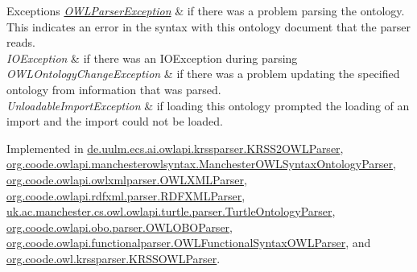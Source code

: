 \begin{DoxyExceptions}{Exceptions}
{\em \hyperlink{classorg_1_1semanticweb_1_1owlapi_1_1io_1_1_o_w_l_parser_exception}{O\-W\-L\-Parser\-Exception}} & if there was a problem parsing the ontology. This indicates an error in the syntax with this ontology document that the parser reads. \\
\hline
{\em I\-O\-Exception} & if there was an I\-O\-Exception during parsing \\
\hline
{\em O\-W\-L\-Ontology\-Change\-Exception} & if there was a problem updating the specified ontology from information that was parsed. \\
\hline
{\em Unloadable\-Import\-Exception} & if loading this ontology prompted the loading of an import and the import could not be loaded. \\
\hline
\end{DoxyExceptions}


Implemented in \hyperlink{classde_1_1uulm_1_1ecs_1_1ai_1_1owlapi_1_1krssparser_1_1_k_r_s_s2_o_w_l_parser_afd2431fc79f0a84255f0e6da71e5c0df}{de.\-uulm.\-ecs.\-ai.\-owlapi.\-krssparser.\-K\-R\-S\-S2\-O\-W\-L\-Parser}, \hyperlink{classorg_1_1coode_1_1owlapi_1_1manchesterowlsyntax_1_1_manchester_o_w_l_syntax_ontology_parser_ab5a6096e212c056cae3da829bb78554c}{org.\-coode.\-owlapi.\-manchesterowlsyntax.\-Manchester\-O\-W\-L\-Syntax\-Ontology\-Parser}, \hyperlink{classorg_1_1coode_1_1owlapi_1_1owlxmlparser_1_1_o_w_l_x_m_l_parser_aa7ce6fbe544a69e410945038dfb207fa}{org.\-coode.\-owlapi.\-owlxmlparser.\-O\-W\-L\-X\-M\-L\-Parser}, \hyperlink{classorg_1_1coode_1_1owlapi_1_1rdfxml_1_1parser_1_1_r_d_f_x_m_l_parser_ac31fe6998b9e5a0bb38e09717b0af739}{org.\-coode.\-owlapi.\-rdfxml.\-parser.\-R\-D\-F\-X\-M\-L\-Parser}, \hyperlink{classuk_1_1ac_1_1manchester_1_1cs_1_1owl_1_1owlapi_1_1turtle_1_1parser_1_1_turtle_ontology_parser_a7325f7301fd0413757d68b7061017a93}{uk.\-ac.\-manchester.\-cs.\-owl.\-owlapi.\-turtle.\-parser.\-Turtle\-Ontology\-Parser}, \hyperlink{classorg_1_1coode_1_1owlapi_1_1obo_1_1parser_1_1_o_w_l_o_b_o_parser_a11be0dea807992da396126623066cfef}{org.\-coode.\-owlapi.\-obo.\-parser.\-O\-W\-L\-O\-B\-O\-Parser}, \hyperlink{classorg_1_1coode_1_1owlapi_1_1functionalparser_1_1_o_w_l_functional_syntax_o_w_l_parser_a954972fee0efd0775cc7dcdb98376f8a}{org.\-coode.\-owlapi.\-functionalparser.\-O\-W\-L\-Functional\-Syntax\-O\-W\-L\-Parser}, and \hyperlink{classorg_1_1coode_1_1owl_1_1krssparser_1_1_k_r_s_s_o_w_l_parser_a03a76fcad20f37c21233a6f5de579919}{org.\-coode.\-owl.\-krssparser.\-K\-R\-S\-S\-O\-W\-L\-Parser}.

